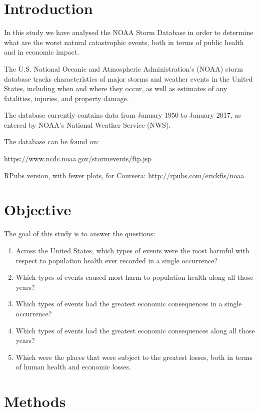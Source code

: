 {
\setcounter{tocdepth}{3}
\tableofcontents
}
\section{Introduction}\label{introduction}

In this study we have analysed the NOAA Storm Database in order to
determine what are the worst natural catastrophic events, both in terms
of public health and in economic impact.

The U.S. National Oceanic and Atmospheric Administration's (NOAA) storm
database tracks characteristics of major storms and weather events in
the United States, including when and where they occur, as well as
estimates of any fatalities, injuries, and property damage.

The database currently contains data from January 1950 to January 2017,
as entered by NOAA's National Weather Service (NWS).

The database can be found on:

\url{https://www.ncdc.noaa.gov/stormevents/ftp.jsp}

RPubs version, with fewer plots, for Coursera:
\url{http://rpubs.com/erickfis/noaa}

\section{Objective}\label{objective}

The goal of this study is to answer the questions:

\begin{enumerate}
\def\labelenumi{\arabic{enumi}.}
\item
  Across the United States, which types of events were the most harmful
  with respect to population health ever recorded in a single
  occurrence?
\item
  Which types of events caused most harm to population health along all
  those years?
\item
  Which types of events had the greatest economic consequences in a
  single occurrence?
\item
  Which types of events had the greatest economic consequences along all
  those years?
\item
  Which were the places that were subject to the greatest losses, both
  in terms of human health and economic losses.
\end{enumerate}

\section{Methods}\label{methods}

